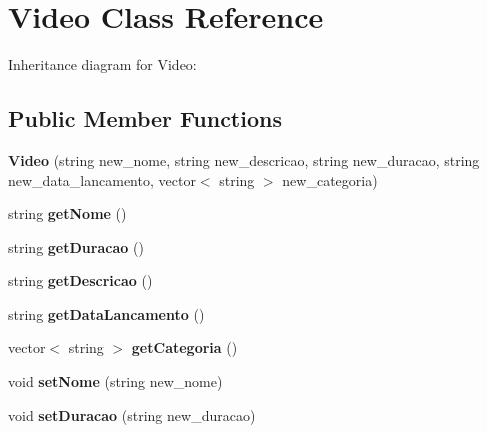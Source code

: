 \hypertarget{classVideo}{}\section{Video Class Reference}
\label{classVideo}


Inheritance diagram for Video\+:
\subsection*{Public Member Functions}
\begin{DoxyCompactItemize}
\item 
{\bfseries Video} (string new\+\_\+nome, string new\+\_\+descricao, string new\+\_\+duracao, string new\+\_\+data\+\_\+lancamento, vector$<$ string $>$ new\+\_\+categoria)\hypertarget{classVideo_a103c29f246e60bc4bffa69540810833d}{}\label{classVideo_a103c29f246e60bc4bffa69540810833d}

\item 
string {\bfseries get\+Nome} ()\hypertarget{classVideo_ac3035c8de729710bc0f216944f52108e}{}\label{classVideo_ac3035c8de729710bc0f216944f52108e}

\item 
string {\bfseries get\+Duracao} ()\hypertarget{classVideo_a4bc57b6ca1b388bf6e6069fc47fdad2e}{}\label{classVideo_a4bc57b6ca1b388bf6e6069fc47fdad2e}

\item 
string {\bfseries get\+Descricao} ()\hypertarget{classVideo_a7c849d776eec017cb3d8a537fc06d39d}{}\label{classVideo_a7c849d776eec017cb3d8a537fc06d39d}

\item 
string {\bfseries get\+Data\+Lancamento} ()\hypertarget{classVideo_a8f9ffc81e5501047af1ce4d11510f30c}{}\label{classVideo_a8f9ffc81e5501047af1ce4d11510f30c}

\item 
vector$<$ string $>$ {\bfseries get\+Categoria} ()\hypertarget{classVideo_a89e9a95b481f991696120c50942bdcc1}{}\label{classVideo_a89e9a95b481f991696120c50942bdcc1}

\item 
void {\bfseries set\+Nome} (string new\+\_\+nome)\hypertarget{classVideo_a575297aa1da19ad764903394ffaad070}{}\label{classVideo_a575297aa1da19ad764903394ffaad070}

\item 
void {\bfseries set\+Duracao} (string new\+\_\+duracao)\hypertarget{classVideo_a8f962ae1a15512ae867920ede1923873}{}\label{classVideo_a8f962ae1a15512ae867920ede1923873}


\end{DoxyCompactItemize}
